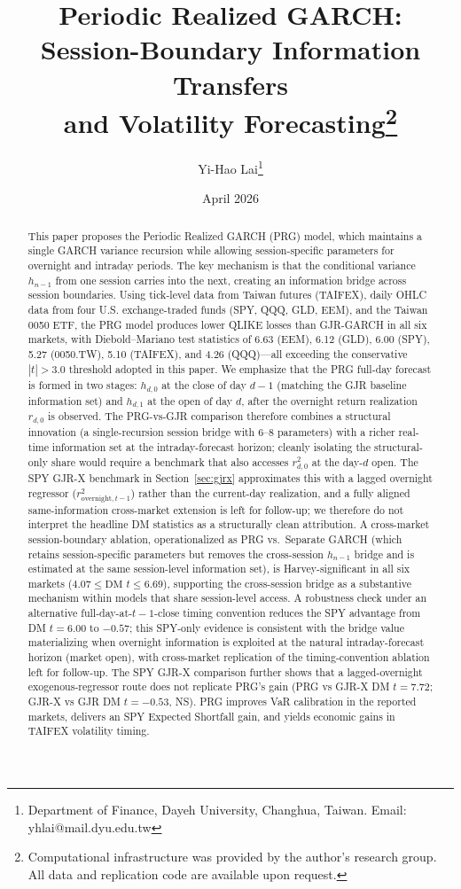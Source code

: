 \documentclass[11pt,a4paper]{article}
\title{Periodic Realized GARCH: \\ Session-Boundary Information Transfers \\ and Volatility Forecasting\thanks{%
Computational infrastructure was provided by the author's research group.
All data and replication code are available upon request.}}
\author{Yi-Hao Lai\thanks{%
Department of Finance, Dayeh University, Changhua, Taiwan.
Email: yhlai@mail.dyu.edu.tw}}
\date{April 2026}
\begin{document}
\maketitle

\begin{abstract}
This paper proposes the Periodic Realized GARCH (PRG) model, which maintains a single GARCH variance recursion while allowing session-specific parameters for overnight and intraday periods. The key mechanism is that the conditional variance $h_{n-1}$ from one session carries into the next, creating an information bridge across session boundaries. Using tick-level data from Taiwan futures (TAIFEX), daily OHLC data from four U.S. exchange-traded funds (SPY, QQQ, GLD, EEM), and the Taiwan 0050 ETF, the PRG model produces lower QLIKE losses than GJR-GARCH in all six markets, with Diebold--Mariano test statistics of 6.63 (EEM), 6.12 (GLD), 6.00 (SPY), 5.27 (0050.TW), 5.10 (TAIFEX), and 4.26 (QQQ)---all exceeding the conservative $|t|>3.0$ threshold adopted in this paper. We emphasize that the PRG full-day forecast is formed in two stages: $h_{d,0}$ at the close of day $d-1$ (matching the GJR baseline information set) and $h_{d,1}$ at the open of day $d$, after the overnight return realization $r_{d,0}$ is observed. The PRG-vs-GJR comparison therefore combines a structural innovation (a single-recursion session bridge with 6--8 parameters) with a richer real-time information set at the intraday-forecast horizon; cleanly isolating the structural-only share would require a benchmark that also accesses $r^2_{d,0}$ at the day-$d$ open. The SPY GJR-X benchmark in Section~\ref{sec:gjrx} approximates this with a lagged overnight regressor ($r^2_{\text{overnight},t-1}$) rather than the current-day realization, and a fully aligned same-information cross-market extension is left for follow-up; we therefore do not interpret the headline DM statistics as a structurally clean attribution. A cross-market session-boundary ablation, operationalized as PRG vs.\ Separate GARCH (which retains session-specific parameters but removes the cross-session $h_{n-1}$ bridge and is estimated at the same session-level information set), is Harvey-significant in all six markets ($4.07 \leq \text{DM } t \leq 6.69$), supporting the cross-session bridge as a substantive mechanism within models that share session-level access. A robustness check under an alternative full-day-at-$t{-}1$-close timing convention reduces the SPY advantage from DM $t = 6.00$ to $-0.57$; this SPY-only evidence is consistent with the bridge value materializing when overnight information is exploited at the natural intraday-forecast horizon (market open), with cross-market replication of the timing-convention ablation left for follow-up. The SPY GJR-X comparison further shows that a lagged-overnight exogenous-regressor route does not replicate PRG's gain (PRG vs GJR-X DM $t = 7.72$; GJR-X vs GJR DM $t = -0.53$, NS). PRG improves VaR calibration in the reported markets, delivers an SPY Expected Shortfall gain, and yields economic gains in TAIFEX volatility timing.


\end{abstract}
\end{document}
